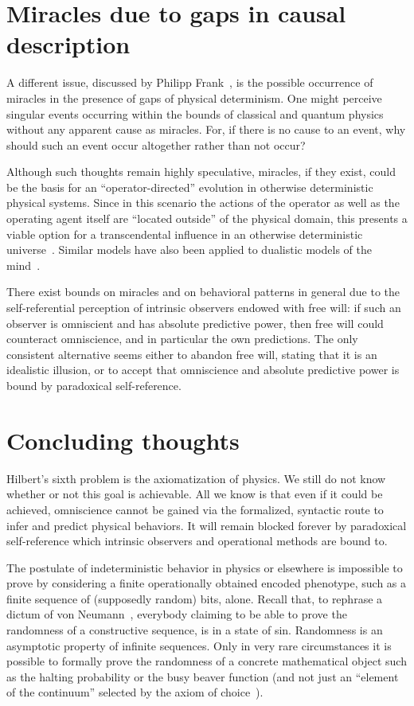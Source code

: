 \documentclass[rmp,amsfonts,showpacs,showkeys,twocolumn]{revtex4}
\begin{document}
\section{Miracles due to gaps in causal description}

A different issue, discussed by Philipp Frank~\cite{frank},
is the possible occurrence of miracles in the presence of gaps of physical determinism.
One might perceive singular events occurring
within the bounds of classical and quantum physics without any apparent cause as miracles.
For, if there is no cause to an event,
why should such an event occur altogether rather than not occur?

Although such thoughts remain highly speculative, miracles,
if they exist,
could be the basis for an ``operator-directed'' evolution in otherwise deterministic physical systems.
Since in this scenario
the actions of the operator as well as the operating agent itself are ``located outside'' of the physical domain,
this presents a viable option for a transcendental influence in an otherwise deterministic universe~\cite{svozil-nat-acad}.
Similar models have also been applied to dualistic models of the mind~\cite{eccles:papal,popper-eccles}.

There exist bounds on miracles and on behavioral patterns in general due to the self-referential
perception of intrinsic observers endowed with free will:
if such an observer is omniscient and has absolute predictive power,
then free will could counteract omniscience, and in particular the own predictions.
The only consistent alternative seems either to abandon free will,
stating that it is an idealistic illusion,
or to accept that omniscience and absolute predictive power is bound by paradoxical self-reference.

\section{Concluding thoughts}



Hilbert's sixth problem is the axiomatization of physics.
We still do not know whether or not this goal is achievable.
All we know is that even if it could be achieved, omniscience cannot be gained
via the formalized, syntactic route to infer and predict physical behaviors.
It will remain blocked forever by paradoxical self-reference
which intrinsic observers and operational methods are bound to.


The postulate of indeterministic behavior in physics or elsewhere is impossible to prove by
considering a finite operationally obtained encoded phenotype, such as a finite sequence of (supposedly random) bits,
alone.
Recall that, to rephrase a dictum of von Neumann~\cite{von-neumann1},
everybody claiming to be able to prove the randomness of a constructive sequence,
is in a state of sin.
Randomness is an asymptotic property of infinite sequences.
Only in very rare circumstances it is possible to formally prove the randomness of a concrete mathematical object
such as the halting probability or the busy beaver function
(and not just an ``element of the continuum'' selected by the axiom of choice~\cite{svozil-set}).
\end{document}
